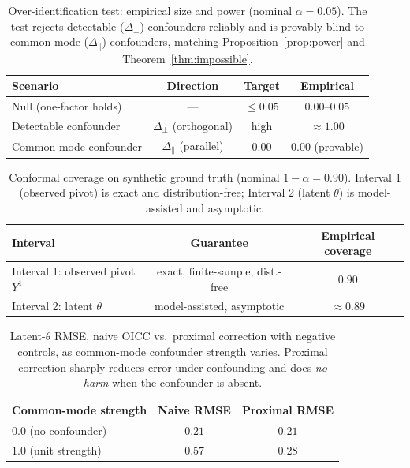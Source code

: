 \documentclass[11pt]{article}
\theoremstyle{definition}
\theoremstyle{remark}
\newcommand{\dperp}{\Delta_{\perp}}
\newcommand{\dpar}{\Delta_{\parallel}}
\begin{document}
\begin{table}[t]
\centering
\caption{Over-identification test: empirical size and power (nominal
$\alpha=0.05$). The test rejects detectable ($\dperp$) confounders reliably
and is provably blind to common-mode ($\dpar$) confounders, matching
Proposition~\ref{prop:power} and Theorem~\ref{thm:impossible}.}
\label{tab:overid}
\begin{tabular}{lccc}
\toprule
Scenario & Direction & Target & Empirical \\
\midrule
Null (one-factor holds)         & ---                 & $\le 0.05$ & $0.00$--$0.05$ \\
Detectable confounder           & $\dperp$ (orthogonal)& high       & $\approx 1.00$ \\
Common-mode confounder          & $\dpar$ (parallel)  & $0.00$     & $0.00$ (provable) \\
\bottomrule
\end{tabular}
\end{table}

\begin{table}[t]
\centering
\caption{Conformal coverage on synthetic ground truth (nominal
$1-\alpha=0.90$). Interval 1 (observed pivot) is exact and distribution-free;
Interval 2 (latent $\theta$) is model-assisted and asymptotic.}
\label{tab:coverage}
\begin{tabular}{lcc}
\toprule
Interval & Guarantee & Empirical coverage \\
\midrule
Interval 1: observed pivot $Y^1$ & exact, finite-sample, dist.-free & $0.90$ \\
Interval 2: latent $\theta$      & model-assisted, asymptotic       & $\approx 0.89$ \\
\bottomrule
\end{tabular}
\end{table}

\begin{table}[t]
\centering
\caption{Latent-$\theta$ RMSE, naive OICC vs.\ proximal correction with
negative controls, as common-mode confounder strength varies. Proximal
correction sharply reduces error under confounding and does \emph{no harm}
when the confounder is absent.}
\label{tab:proximal}
\begin{tabular}{lcc}
\toprule
Common-mode strength & Naive RMSE & Proximal RMSE \\
\midrule
$0.0$ (no confounder) & $0.21$ & $0.21$ \\
$1.0$ (unit strength) & $0.57$ & $0.28$ \\
\bottomrule
\end{tabular}
\end{table}
\end{document}
